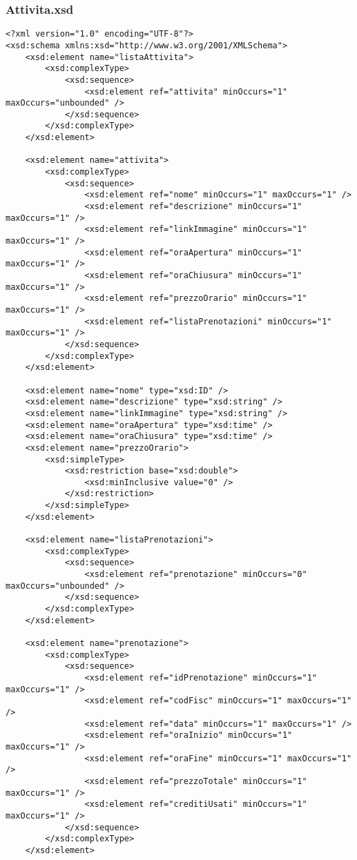 \documentclass [a4paper, 12pt]{book}
\begin{document}
\subsubsection{Attivita.xsd}
\begin{lstlisting}[style=XML]
<?xml version="1.0" encoding="UTF-8"?>
<xsd:schema xmlns:xsd="http://www.w3.org/2001/XMLSchema">
    <xsd:element name="listaAttivita">
        <xsd:complexType>
            <xsd:sequence>
                <xsd:element ref="attivita" minOccurs="1" maxOccurs="unbounded" />
            </xsd:sequence>
        </xsd:complexType>
    </xsd:element>

    <xsd:element name="attivita">
        <xsd:complexType>
            <xsd:sequence>
                <xsd:element ref="nome" minOccurs="1" maxOccurs="1" />
                <xsd:element ref="descrizione" minOccurs="1" maxOccurs="1" />
                <xsd:element ref="linkImmagine" minOccurs="1" maxOccurs="1" />
                <xsd:element ref="oraApertura" minOccurs="1" maxOccurs="1" />
                <xsd:element ref="oraChiusura" minOccurs="1" maxOccurs="1" />
                <xsd:element ref="prezzoOrario" minOccurs="1" maxOccurs="1" />
                <xsd:element ref="listaPrenotazioni" minOccurs="1" maxOccurs="1" />
            </xsd:sequence>
        </xsd:complexType>
    </xsd:element>

    <xsd:element name="nome" type="xsd:ID" />
    <xsd:element name="descrizione" type="xsd:string" />
    <xsd:element name="linkImmagine" type="xsd:string" />
    <xsd:element name="oraApertura" type="xsd:time" />
    <xsd:element name="oraChiusura" type="xsd:time" />
    <xsd:element name="prezzoOrario">
        <xsd:simpleType>
            <xsd:restriction base="xsd:double">
                <xsd:minInclusive value="0" />
            </xsd:restriction>
        </xsd:simpleType>
    </xsd:element>

    <xsd:element name="listaPrenotazioni">
        <xsd:complexType>
            <xsd:sequence>
                <xsd:element ref="prenotazione" minOccurs="0" maxOccurs="unbounded" /> 
            </xsd:sequence>
        </xsd:complexType>
    </xsd:element>

    <xsd:element name="prenotazione">
        <xsd:complexType>
            <xsd:sequence>
                <xsd:element ref="idPrenotazione" minOccurs="1" maxOccurs="1" />
                <xsd:element ref="codFisc" minOccurs="1" maxOccurs="1" />
                <xsd:element ref="data" minOccurs="1" maxOccurs="1" />
                <xsd:element ref="oraInizio" minOccurs="1" maxOccurs="1" />
                <xsd:element ref="oraFine" minOccurs="1" maxOccurs="1" />
                <xsd:element ref="prezzoTotale" minOccurs="1" maxOccurs="1" />
                <xsd:element ref="creditiUsati" minOccurs="1" maxOccurs="1" />
            </xsd:sequence>
        </xsd:complexType>
    </xsd:element>


\end{lstlisting}
\end{document}
